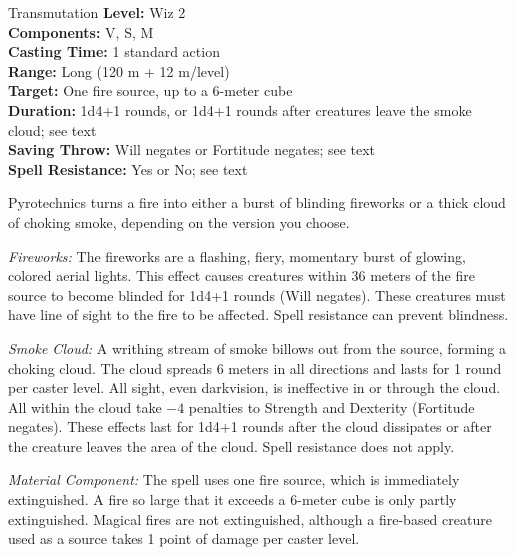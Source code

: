 {Transmutation}
{
	\textbf{Level:}
	Wiz 2\\
	\textbf{Components:}
	V, S, M\\
	\textbf{Casting Time:}
	1 standard action\\
	\textbf{Range:}
	Long (120 m + 12 m/level)\\
	\textbf{Target:}
	One fire source, up to a 6-meter cube\\
	\textbf{Duration:}
	1d4+1 rounds, or 1d4+1 rounds after creatures leave the smoke cloud; see text\\
	\textbf{Saving Throw:}
	Will negates or Fortitude negates; see text\\
	\textbf{Spell Resistance:}
	Yes or No; see text\\
}
{
	Pyrotechnics turns a fire into either a burst of blinding fireworks or a thick cloud of choking smoke, depending on the version you choose.

	\textit{Fireworks:} The fireworks are a flashing, fiery, momentary burst of glowing, colored aerial lights. This effect causes creatures within 36 meters of the fire source to become blinded for 1d4+1 rounds (Will negates). These creatures must have line of sight to the fire to be affected. Spell resistance can prevent blindness.

	\textit{Smoke Cloud:} A writhing stream of smoke billows out from the source, forming a choking cloud. The cloud spreads 6 meters in all directions and lasts for 1 round per caster level. All sight, even darkvision, is ineffective in or through the cloud. All within the cloud take $-4$ penalties to Strength and Dexterity (Fortitude negates). These effects last for 1d4+1 rounds after the cloud dissipates or after the creature leaves the area of the cloud. Spell resistance does not apply.

	\textit{Material Component:} The spell uses one fire source, which is immediately extinguished. A fire so large that it exceeds a 6-meter cube is only partly extinguished. Magical fires are not extinguished, although a fire-based creature used as a source takes 1 point of damage per caster level.
}
